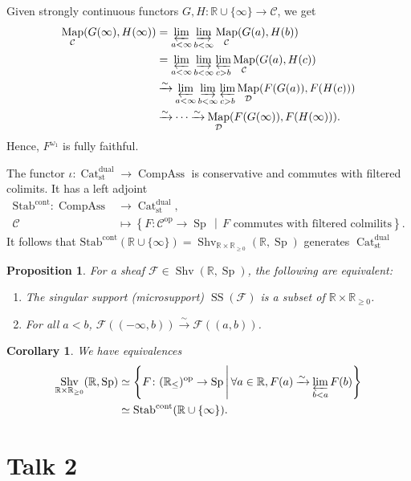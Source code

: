 \documentclass[draft]{amsart}
\newcommand{\RR}{\mathbb{R}}
\newcommand{\set}[2]{\left\{#1\,\middle|\,#2\right\}}
\newcommand{\cat}[1]{\mathcal{#1}}
\newcommand{\sheaf}[1]{\mathcal{#1}}
\newcommand{\op}{\mathrm{op}}
\newcommand{\isoto}{\mathbin{\xrightarrow{\sim}}}
\newcommand{\Stab}{\mathrm{Stab}}
\DeclareMathOperator{\SingularSupport}{SS}
\DeclareMathOperator{\Map}{Map}
\DeclareMathOperator{\Shv}{Shv}
\DeclareMathOperator{\Cat}{Cat}
\DeclareMathOperator{\CompAss}{CompAss}
\DeclareMathOperator{\Sp}{Sp}
\newtheorem{prop}[thm]{Proposition}
\newtheorem{cor}[thm]{Corollary}
\theoremstyle{definition}
\begin{document}
Given strongly continuous functors $G, H\colon \RR\cup \{\infty\} \to \cat C$, we get
\begin{align*}
\Map_{\cat C}(G(\infty), H(\infty)) &= \varprojlim_{a<\infty} \varinjlim\limits_{b<\infty} \Map_{\cat C}(G(a), H(b)) \\
&= \varprojlim_{a<\infty} \varinjlim\limits_{b<\infty} \varprojlim_{c>b} \Map_{\cat C}(G(a), H(c)) \\
&\isoto \varprojlim_{a<\infty} \varinjlim\limits_{b<\infty} \varprojlim_{c>b} \Map_{\cat D}(F(G(a)), F(H(c))) \\
&\isoto \dotsb \isoto \Map_{\cat D}(F(G(\infty)), F(H(\infty))).
\end{align*}
Hence, $F^{\omega_1}$ is fully faithful.
\bigskip

The functor $\iota\colon \Cat^{\mathrm{dual}}_{\mathrm{st}} \to \CompAss$ is conservative and commutes with filtered colimits. It has a left adjoint 
\begin{align*}
\Stab^{\mathrm{cont}} \colon \CompAss &\to \Cat^{\mathrm{dual}}_{\mathrm{st}}, \\
\cat C &\mapsto \set{F\colon \cat C^\op\to \Sp}{\text{$F$ commutes with filtered colmilits}}.
\end{align*}
It follows that $\Stab^{\mathrm{cont}}(\RR\cup\{\infty\}) = \Shv_{\RR\times \RR_{\ge0}}(\RR, \Sp)$ generates $\Cat^{\mathrm{dual}}_{\mathrm{st}}$

\begin{prop}
For a sheaf $\sheaf F \in \Shv(\RR, \Sp)$, the following are equivalent:
\begin{enumerate}[(1)]
\item The singular support (microsupport) $\SingularSupport(\sheaf F)$ is a subset of $\RR\times \RR_{\ge0}$.
\item For all $a<b$, $\sheaf F((-\infty,b)) \isoto \sheaf F((a,b))$.
\end{enumerate}
\end{prop}

\begin{cor}
We have equivalences
\begin{align*}
\Shv_{\RR\times \RR_{\ge0}}(\RR, \Sp) &\simeq \set{F\colon (\RR_{\le})^\op \to \Sp}{\forall a\in \RR, F(a) \isoto \varprojlim_{b<a} F(b)} \\
&\simeq \Stab^{\mathrm{cont}}(\RR\cup\{\infty\}).
\end{align*}
\end{cor}

\section{Talk 2}
\end{document}
